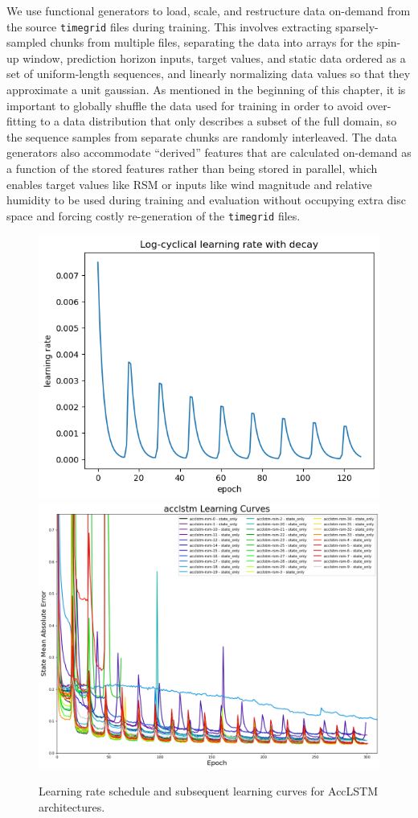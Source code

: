 We use functional generators to load, scale, and restructure data on-demand from the source \texttt{timegrid} files during training. This involves extracting sparsely-sampled chunks from multiple files, separating the data into arrays for the spin-up window, prediction horizon inputs, target values, and static data ordered as a set of uniform-length sequences, and linearly normalizing data values so that they approximate a unit gaussian. As mentioned in the beginning of this chapter, it is important to globally shuffle the data used for training in order to avoid over-fitting to a data distribution that only describes a subset of the full domain, so the sequence samples from separate chunks are randomly interleaved. The data generators also accommodate ``derived'' features that are calculated on-demand as a function of the stored features rather than being stored in parallel, which enables target values like RSM or inputs like wind magnitude and relative humidity to be used during training and evaluation without occupying extra disc space and forcing costly re-generation of the \texttt{timegrid} files.

\begin{figure}[h!]
    \centering
    \includegraphics[width=.48\linewidth]{figures/cyclical_lr_logarithmic.png}
    \includegraphics[width=.48\linewidth]{figures/learning-curves_acclstm.png}

    \caption{Learning rate schedule and subsequent learning curves for AccLSTM architectures.}
    \label{learning-rate}
\end{figure}

